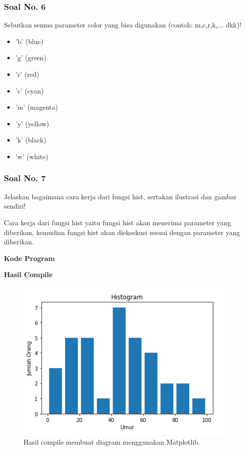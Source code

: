 \subsubsection{Soal No. 6}
\hfill \break
Sebutkan semua parameter color yang bisa digunakan (contoh:  m,c,r,k,...  dkk)!

\begin{itemize}
	\item 'b' (blue)
	\item 'g' (green)
	\item 'r' (red)
	\item 'c' (cyan)
	\item 'm' (magenta)
	\item 'y' (yellow)
	\item 'k' (black)
	\item 'w' (white)
\end{itemize}

\subsubsection{Soal No. 7}
\hfill \break
Jelaskan bagaimana cara kerja dari fungsi hist, sertakan ilustrasi dan gambar sendiri!

\hfill \break
Cara kerja dari fungsi hist yaitu fungsi hist akan menerima parameter yang diberikan, kemudian fungsi hist akan dieksekusi sesuai dengan parameter yang diberikan.

\hfill \break
\textbf{Kode Program}



\hfill \break
\textbf{Hasil Compile}

\begin{figure}[H]
	\includegraphics[width=12cm]{figures/6/1174034/Teori/histogram.png}
	\centering
	\caption{Hasil compile membuat diagram menggunakan Matplotlib.}
\end{figure}

